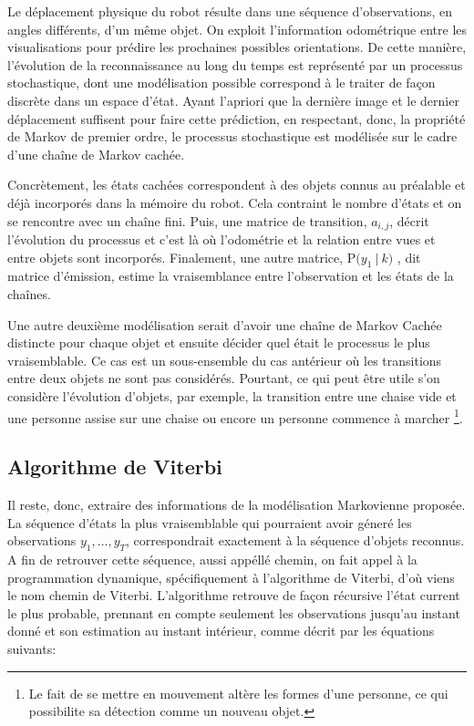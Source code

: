 Le déplacement physique du robot résulte dans une séquence
d'observations, en angles différents, d'un même objet. On exploit
l'information odométrique entre les visualisations pour prédire les
prochaines possibles orientations. De cette manière, l'évolution de la
reconnaissance au long du temps est représenté par un processus
stochastique, dont une modélisation possible correspond à le traiter
de façon discrète dans un espace d'état. Ayant l'apriori que la
dernière image et le dernier déplacement suffisent pour faire cette
prédiction, en respectant, donc, la propriété de Markov de premier
ordre, le processus stochastique est modélisée sur le cadre d'une
chaîne de Markov cachée.

Concrètement, les états cachées correspondent à des objets connus au
préalable et déjà incorporés dans la mémoire du robot. Cela contraint le
nombre d'états et on se rencontre avec un chaîne fini. Puis, une
matrice de transition, $a_{i,j}$, décrit l'évolution du processus et c'est là où
l'odométrie et la relation entre vues et entre objets sont
incorporés. Finalement, une autre matrice, $\mathrm{P}\big( y_1 \ | \ k \big)$
, dit matrice d'émission, estime la vraisemblance entre l'observation
et les états de la chaînes.

Une autre deuxième modélisation serait d'avoir une chaîne de Markov
Cachée distincte pour chaque objet et ensuite décider quel était le
processus le plus vraisemblable. Ce cas est un sous-ensemble du cas
antérieur où les transitions entre deux objets ne sont pas
considérés. Pourtant, ce qui peut être utile s'on considère
l'évolution d'objets, par exemple, la transition entre une chaise vide
et une personne assise sur une chaise ou encore un personne
commence à marcher \footnote{Le fait de se mettre en mouvement
  altère les formes d'une personne, ce qui possibilite sa détection
  comme un nouveau objet.}.

\subsection{Algorithme de Viterbi}

Il reste, donc, extraire des informations de la modélisation Markovienne proposée.
La séquence d'états la plus vraisemblable qui pourraient avoir géneré
les observations  $y_1,\dots, y_T$, correspondrait exactement à la séquence d'objets reconnus.
A fin de retrouver cette séquence, aussi appéllé chemin, on fait 
appel à la programmation dynamique, spécifiquement à l'algorithme de Viterbi, d'où viens le nom chemin de Viterbi.
L'algorithme retrouve de façon récursive l'état current le plus probable, 
prennant en compte seulement les observations jusqu'au instant donné et son
estimation au instant intérieur, comme décrit par les équations suivants:

